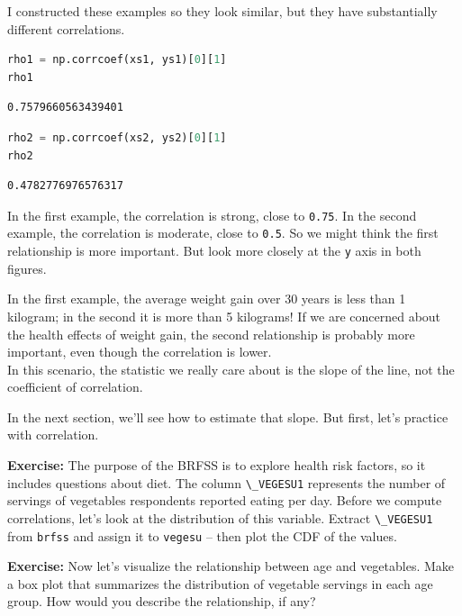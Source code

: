 I constructed these examples so they look similar, but they have
substantially different correlations.

\begin{lstlisting}[language=Python,style=source]
rho1 = np.corrcoef(xs1, ys1)[0][1]
rho1
\end{lstlisting}

\begin{lstlisting}[style=output]
0.7579660563439401
\end{lstlisting}

\begin{lstlisting}[language=Python,style=source]
rho2 = np.corrcoef(xs2, ys2)[0][1]
rho2
\end{lstlisting}

\begin{lstlisting}[style=output]
0.4782776976576317
\end{lstlisting}

In the first example, the correlation is strong, close to
\passthrough{\lstinline!0.75!}. In the second example, the correlation
is moderate, close to \passthrough{\lstinline!0.5!}. So we might think
the first relationship is more important. But look more closely at the
\passthrough{\lstinline!y!} axis in both figures.

In the first example, the average weight gain over 30 years is less than
1 kilogram; in the second it is more than 5 kilograms! If we are
concerned about the health effects of weight gain, the second
relationship is probably more important, even though the correlation is
lower.\\
In this scenario, the statistic we really care about is the slope of the
line, not the coefficient of correlation.

In the next section, we'll see how to estimate that slope. But first,
let's practice with correlation.

\textbf{Exercise:} The purpose of the BRFSS is to explore health risk
factors, so it includes questions about diet. The column
\passthrough{\lstinline!\_VEGESU1!} represents the number of servings of
vegetables respondents reported eating per day. Before we compute
correlations, let's look at the distribution of this variable. Extract
\passthrough{\lstinline!\_VEGESU1!} from \passthrough{\lstinline!brfss!}
and assign it to \passthrough{\lstinline!vegesu!} -- then plot the CDF
of the values.

\textbf{Exercise:} Now let's visualize the relationship between age and
vegetables. Make a box plot that summarizes the distribution of
vegetable servings in each age group. How would you describe the
relationship, if any?

